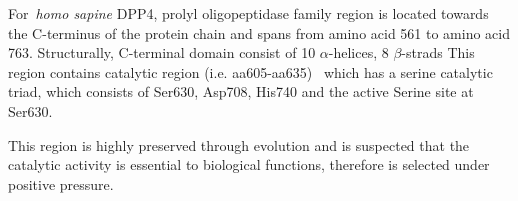 For~\textit{homo sapine} DPP4, prolyl oligopeptidase family region is located towards the C-terminus of the protein chain and spans from amino acid 561 to amino acid 763. Structurally, C-terminal domain consist of 10 $\alpha$-helices, 8 $\beta$-strads This region contains catalytic region (i.e. aa605-aa635)~\cite{Rawlings1991,Barrett1992,Polgár1992,Rawlings1994} which has a serine catalytic triad, which consists of Ser630, Asp708, His740 and the active Serine site at Ser630. \par
This region is highly preserved through evolution and is suspected that the catalytic activity is essential to biological functions, therefore is selected under positive pressure. 